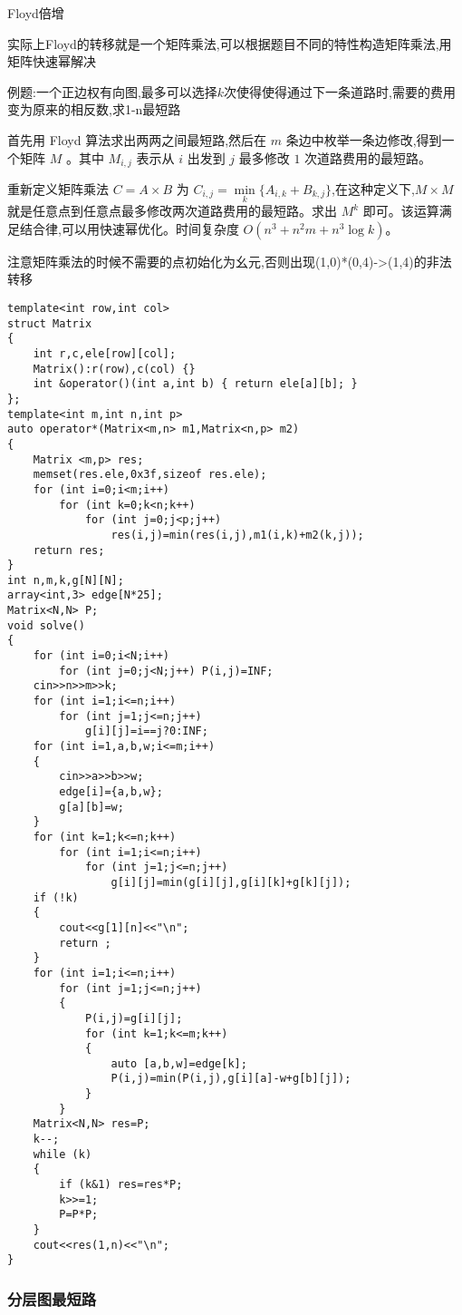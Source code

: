 \documentclass[a4paper]{ctexart}
\begin{document}
Floyd倍增

实际上Floyd的转移就是一个矩阵乘法,可以根据题目不同的特性构造矩阵乘法,用矩阵快速幂解决

例题:一个正边权有向图,最多可以选择$k$次使得使得通过下一条道路时,需要的费用变为原来的相反数,求1-n最短路

首先用 Floyd 算法求出两两之间最短路,然后在 $m$ 条边中枚举一条边修改,得到一个矩阵 $M$ 。其中 $M_{i,j}$ 表示从 $i$ 出发到 $j$ 最多修改 $1$ 次道路费用的最短路。

重新定义矩阵乘法 $C=A\times B$ 为 $C_{i,j}=\min\limits_k\{A_{i,k}+B_{k,j}\}$,在这种定义下,$M\times M$ 就是任意点到任意点最多修改两次道路费用的最短路。求出 $M^k$ 即可。该运算满足结合律,可以用快速幂优化。时间复杂度 $O(n^3+n^2m+n^3\log k)$。

注意矩阵乘法的时候不需要的点初始化为幺元,否则出现(1,0)*(0,4)->(1,4)的非法转移

\begin{lstlisting}
template<int row,int col>
struct Matrix
{
    int r,c,ele[row][col];
    Matrix():r(row),c(col) {}
    int &operator()(int a,int b) { return ele[a][b]; }
};
template<int m,int n,int p>
auto operator*(Matrix<m,n> m1,Matrix<n,p> m2)
{
    Matrix <m,p> res;
    memset(res.ele,0x3f,sizeof res.ele);
    for (int i=0;i<m;i++)
        for (int k=0;k<n;k++)
            for (int j=0;j<p;j++)
                res(i,j)=min(res(i,j),m1(i,k)+m2(k,j));
    return res;
}
int n,m,k,g[N][N];
array<int,3> edge[N*25];
Matrix<N,N> P;
void solve()
{
    for (int i=0;i<N;i++)
        for (int j=0;j<N;j++) P(i,j)=INF;
    cin>>n>>m>>k;
    for (int i=1;i<=n;i++)
        for (int j=1;j<=n;j++)
            g[i][j]=i==j?0:INF;
    for (int i=1,a,b,w;i<=m;i++)
    {
        cin>>a>>b>>w;
        edge[i]={a,b,w};
        g[a][b]=w;
    }
    for (int k=1;k<=n;k++)
        for (int i=1;i<=n;i++)
            for (int j=1;j<=n;j++)
                g[i][j]=min(g[i][j],g[i][k]+g[k][j]);
    if (!k)
    {
        cout<<g[1][n]<<"\n";
        return ;
    }
    for (int i=1;i<=n;i++)
        for (int j=1;j<=n;j++)
        {
            P(i,j)=g[i][j];
            for (int k=1;k<=m;k++)
            {
                auto [a,b,w]=edge[k];
                P(i,j)=min(P(i,j),g[i][a]-w+g[b][j]);
            }
        }
    Matrix<N,N> res=P;
    k--;
    while (k)
    {
        if (k&1) res=res*P;
        k>>=1;
        P=P*P;
    }
    cout<<res(1,n)<<"\n";
}
\end{lstlisting}

\subsubsection{分层图最短路}
\end{document}
